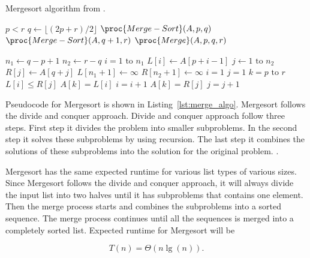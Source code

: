 \documentclass[sigconf, nonacm, natbib, screen, balance=False]{acmart}
\begin{document}
    \begin{listing}
	  \caption{Mergesort algorithm from \citet[Ch.~2.3]{CLRS_2009}.}
	  \label{lst:merge_algo}
	  \begin{codebox}
	     \li \If $p<r$
		\Do
		\li $q \gets \lfloor(2p+r)/2\rfloor$
		\li $\proc{Merge-Sort}(A,p,q)$
		\li $\proc{Merge-Sort}(A,q+1,r)$
		\li $\proc{Merge}(A,p,q,r)$
		\End
	  \end{codebox}
	  \begin{codebox}
		\Procname{$\proc{Merge}(A,p,q,r)$}
		\li $n_1 \gets q-p+1$
		\li $n_2 \gets r-q$
		\li \For $ i=1 \text{ to } n_1$
		\Do
		\li $L[i] \gets A[p+i-1]$
		\End
		\li \For $j \gets 1 \text{ to } n_2$
		\Do
		\li $R[j] \gets A[q+j]$
		\End
		\li $L[n_1+1]\gets \infty$
		\li $R[n_2+1]\gets \infty$
		\li $i=1$
		\li $j=1$
		\li \For $k=p \text{ to } r$
		\Do
		\li \If $L[i] \leq R[j]$
		\Do
		\li $A[k] = L[i]$
		\li $i = i+1$
		\li \Else $A[k]=R[j]$
		\li $j=j+1$
		\End
		\End
	  \end{codebox}
	\end{listing}
\FloatBarrier
Pseudocode for Mergesort is shown in Listing~\ref{lst:merge_algo}. Mergesort follows the divide and conquer approach. Divide and conquer approach follow three steps. First step it divides the problem into smaller subproblems. In the second step it solves these subproblems by using recursion. The last step it combines the solutions of these subproblems into the solution for the original problem. \citet{CLRS_2009}.

Mergesort has the same expected runtime for various list types of various sizes. Since Mergesort follows the divide and conquer approach, it will always divide the input list into two halves until it has subproblems that contains one element. Then the merge process starts and combines the subproblems into a sorted sequence. The merge process continues until all the sequences is merged into a completely sorted list. Expected runtime for Mergesort will be     

\begin{equation*}
	T(n) = \Theta(n\lg(n)).
\end{equation*} 
\citet{CLRS_2009} 
\end{document}
